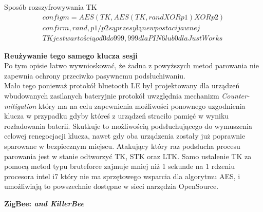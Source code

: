 Sposób rozszyfrowywania TK
\begin{gather*}
        configm = AES(TK, AES(TK, rand XOR p1) XOR p2)\\
        confirm, rand, p1/p2 są przesyłąne w postaci jawnej \\
        TK jest wartością od 0 do 999,999 dla PIN6 lub 0 dla JustWorks
\end{gather*}


\par
\tab \textbf{Reużywanie tego samego klucza sesji} \\

\tab Po tym opisie łatwo wywnioskować, że żadna z powyższych metod parowania nie zapewnia ochrony przeciwko pasywnemu podsłuchiwaniu. \\
Mało tego ponieważ protokół bluetooth LE był projektowany dla urządzeń wbudowanych zasilanych bateryjnie protokół uwzględnia mechanizm \textit{Counter-mitigation} który ma na celu zapewnienia możliwości ponownego uzgodnienia klucza w przypadku gdyby któreś z urządzeń straciło pamięć w wyniku rozładowania baterii. Skutkuje to możliwością podsłuchującego do wymuszenia celowej renegocjacji klucza, nawet gdy oba urządzenia zostały już poprawnie sparowane w bezpiecznym miejscu.
Atakujący który raz podsłucha procesu parowania jest w stanie odtworzyć TK, STK oraz LTK. 
Samo ustalenie TK za pomocą metod typu bruteforce zajmuje mniej niż 1 sekunde na 1 rdzeniu procesora intel i7 który nie ma sprzętowego wsparcia dla algorytmu AES, i umożliwiają to powszechnie dostępne w sieci narzędzia OpenSource. \\


\par
\tab \textbf{ ZigBee: \textit{and KillerBee}  }\\

